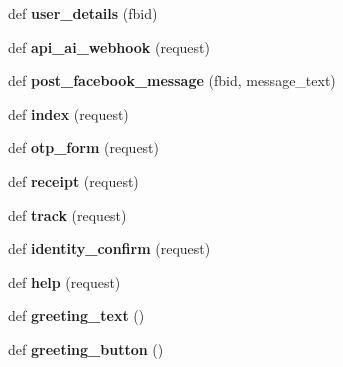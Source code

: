 \begin{DoxyCompactItemize}
\item 
\mbox{\label{namespacemessengerbot_1_1views_ab1f6e22eebdb8099aa11080d19d6d998}} 
def {\bfseries user\+\_\+details} (fbid)
\item 
\mbox{\label{namespacemessengerbot_1_1views_a197d2929ea4b8b6832965a1d66b60fd6}} 
def {\bfseries api\+\_\+ai\+\_\+webhook} (request)
\item 
\mbox{\label{namespacemessengerbot_1_1views_a1640e1dc00146c9ca843d7a746cf122d}} 
def {\bfseries post\+\_\+facebook\+\_\+message} (fbid, message\+\_\+text)
\item 
\mbox{\label{namespacemessengerbot_1_1views_ad89592c43fcbe0c4cb07945221e109fc}} 
def {\bfseries index} (request)
\item 
\mbox{\label{namespacemessengerbot_1_1views_acb353edab49a475685bc8c8830e1d91e}} 
def {\bfseries otp\+\_\+form} (request)
\item 
\mbox{\label{namespacemessengerbot_1_1views_a690221e7f4637eb42ba9d734fb2f2493}} 
def {\bfseries receipt} (request)
\item 
\mbox{\label{namespacemessengerbot_1_1views_acc602ca40d1ea9e8630f8af91fed19c9}} 
def {\bfseries track} (request)
\item 
\mbox{\label{namespacemessengerbot_1_1views_a0422c7b7111b5e4de6bc606e67c554ef}} 
def {\bfseries identity\+\_\+confirm} (request)
\item 
\mbox{\label{namespacemessengerbot_1_1views_a56c122fb7a1524b4722761a9d0093554}} 
def {\bfseries help} (request)
\item 
\mbox{\label{namespacemessengerbot_1_1views_a001bef22e3a7e6c9385e486f6e22b679}} 
def {\bfseries greeting\+\_\+text} ()
\item 
\mbox{\label{namespacemessengerbot_1_1views_ac320ab20a7fa639fb9ba9207e5ab7942}} 
def {\bfseries greeting\+\_\+button} ()
\end{DoxyCompactItemize}
